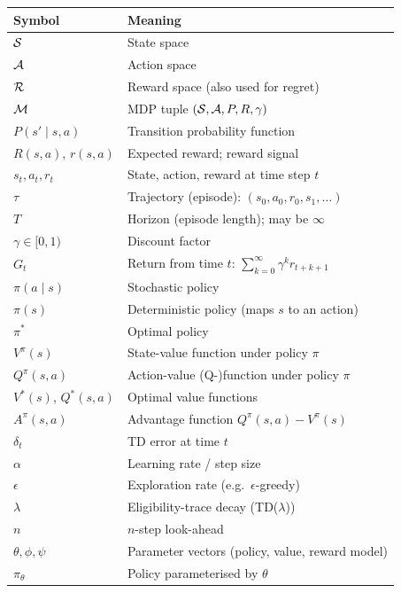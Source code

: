 \begin{center}
\begin{tabular}{@{}ll@{}}
\toprule
\textbf{Symbol} & \textbf{Meaning} \\
\midrule
$\mathcal{S}$               & State space \\
$\mathcal{A}$               & Action space \\
$\mathcal{R}$               & Reward space (also used for regret) \\
$\mathcal{M}$               & MDP tuple $(\mathcal{S},\mathcal{A},P,R,\gamma)$ \\
$P(s'\mid s,a)$     & Transition probability function \\
$R(s,a)$, $r(s,a)$  & Expected reward; reward signal \\
$s_t, a_t, r_t$     & State, action, reward at time step $t$ \\
$\tau$              & Trajectory (episode): $(s_0,a_0,r_0,s_1,\ldots)$ \\
$T$                 & Horizon (episode length); may be $\infty$ \\
$\gamma \in [0,1)$  & Discount factor \\
$G_t$               & Return from time $t$: $\sum_{k=0}^{\infty}\gamma^k r_{t+k+1}$ \\
$\pi(a\mid s)$      & Stochastic policy \\
$\pi(s)$            & Deterministic policy (maps $s$ to an action) \\
$\pi^*$             & Optimal policy \\
$V^\pi(s)$          & State-value function under policy $\pi$ \\
$Q^\pi(s,a)$        & Action-value (Q-)function under policy $\pi$ \\
$V^*(s)$, $Q^*(s,a)$ & Optimal value functions \\
$A^\pi(s,a)$        & Advantage function $Q^\pi(s,a)-V^\pi(s)$ \\
$\delta_t$          & TD error at time $t$ \\
$\alpha$            & Learning rate / step size \\
$\epsilon$          & Exploration rate (e.g.\ $\epsilon$-greedy) \\
$\lambda$           & Eligibility-trace decay (TD($\lambda$)) \\
$n$                 & $n$-step look-ahead \\
$\theta, \phi, \psi$  & Parameter vectors (policy, value, reward model) \\
$\pi_\theta$        & Policy parameterised by $\theta$ \\

\end{tabular}
\end{center}
